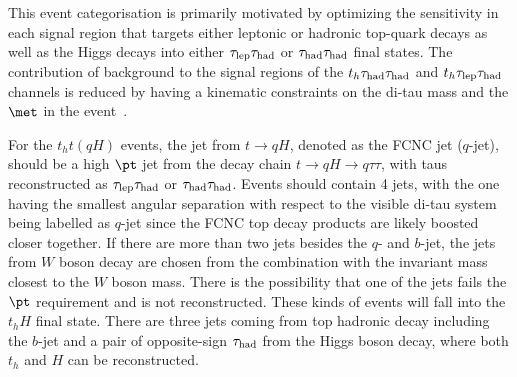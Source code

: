 \documentclass[PAPER, coverpage, atlasdraft=true, texlive=2016, UKenglish]{\ATLASLATEXPATH atlasdoc} %
\begin{document}
This event categorisation is primarily motivated by optimizing the sensitivity in each signal region that targets either leptonic or hadronic top-quark
decays as well as the Higgs decays into either $\tau_{\mathrm{lep}} \tau_{\mathrm{had}}$ or $\tau_{\mathrm{had}} \tau_{\mathrm{had}}$ final states.   
The contribution of background to the signal regions of the $t_h\tau_{\mathrm{had}} \tau_{\mathrm{had}}$ and $t_h\tau_{\mathrm{lep}} \tau_{\mathrm{had}}$ channels is reduced by having a kinematic constraints on the di-tau mass and the $\met$ in the event~\cite{Chen:2015nta}.


For the $t_ht(qH)$ events, the jet from $t\to qH$, denoted as the FCNC jet ($q$-jet), should be a high $\pt$ jet from the
decay chain $t\to qH\to q\tau\tau$, with taus reconstructed as $\tau_{\mathrm{lep}} \tau_{\mathrm{had}}$ or $\tau_{\mathrm{had}} \tau_{\mathrm{had}}$.
Events should contain 4 jets, with the one having the smallest angular separation with respect to the visible di-tau system being labelled as  $q$-jet since the FCNC top decay products are likely boosted closer together. 
If there are more than two jets besides the $q$- and $b$-jet, the jets from $W$ boson decay are chosen from the combination
with the invariant mass closest to the $W$ boson mass. There is the possibility that one of the jets fails the $\pt$ requirement and is not reconstructed.
These kinds of events will fall into the $t_hH$ final state.
There are three jets coming from top hadronic decay including the $b$-jet and a pair of opposite-sign $\tau_{\mathrm{had}}$ from the Higgs boson decay, where
both $t_h$ and $H$ can be reconstructed.  
\end{document}
